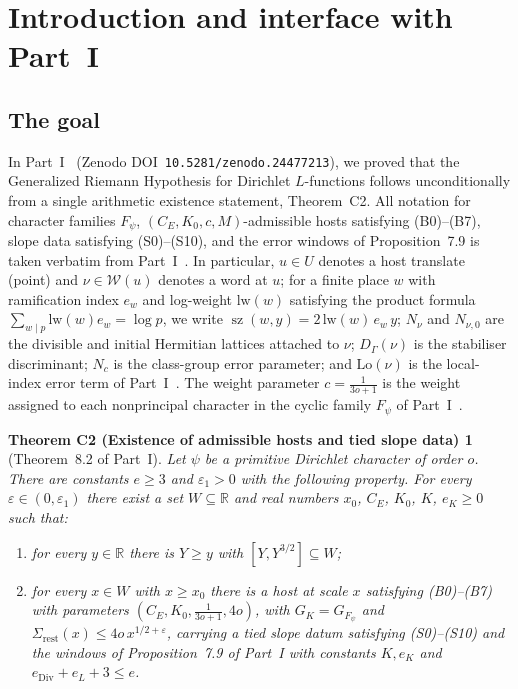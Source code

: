 \documentclass[11pt]{amsart}
\newcommand{\R}{\mathbb{R}}
\newcommand{\eps}{\varepsilon}
\DeclareMathOperator{\sz}{sz}
\theoremstyle{plain}
\newtheorem*{theoremC2}{Theorem C2 (Existence of admissible hosts and tied slope data)}
\theoremstyle{definition}
\numberwithin{equation}{section}
\begin{document}
\section{Introduction and interface with Part~I}\label{sec:intro}

\subsection{The goal}

In Part~I~\cite{dixit-part1} (Zenodo DOI~\texttt{10.5281/zenodo.24477213}), we proved that the
Generalized Riemann Hypothesis for Dirichlet $L$-functions follows unconditionally from a single
arithmetic existence statement, Theorem~C2. All notation for character families $F_\psi$,
$(C_E,K_0,c,M)$-admissible hosts satisfying (B0)--(B7), slope data satisfying (S0)--(S10), and the
error windows of Proposition~7.9 is taken verbatim from Part~I~\cite[\S\S5--8]{dixit-part1}.
In particular, $u\in U$ denotes a host translate (point) and $\nu\in\mathcal W(u)$ denotes a word
at $u$; for a finite place $w$ with ramification index $e_w$ and log-weight $\mathrm{lw}(w)$
satisfying the product formula $\sum_{w\mid p}\mathrm{lw}(w)e_w=\log p$, we write
$\sz(w,y)=2\,\mathrm{lw}(w)\,e_w\,y$; $N_\nu$ and $N_{\nu,0}$ are the divisible and initial
Hermitian lattices attached to $\nu$; $D_\Gamma(\nu)$ is the stabiliser discriminant; $N_c$ is the
class-group error parameter; and $\mathrm{Lo}(\nu)$ is the local-index error term of
Part~I~\cite[\S7.1]{dixit-part1}. The weight parameter $c=\frac{1}{3o+1}$ is the weight assigned to
each nonprincipal character in the cyclic family $F_\psi$ of Part~I~\cite[\S8.1]{dixit-part1}.

\begin{theoremC2}[Theorem~8.2 of Part~I]\label{thm:C2}
Let $\psi$ be a primitive Dirichlet character of order $o$. There are constants $e\ge3$ and
$\eps_1>0$ with the following property. For every $\eps\in(0,\eps_1)$ there exist a set
$W\subseteq\R$ and real numbers $x_0$, $C_E$, $K_0$, $K$, $e_K\ge0$ such that:
\begin{enumerate}[label=(\roman*)]
\item for every $y\in\R$ there is $Y\ge y$ with $[Y,Y^{3/2}]\subseteq W$;
\item for every $x\in W$ with $x\ge x_0$ there is a host at scale $x$ satisfying \textup{(B0)--(B7)}
  with parameters $(C_E,K_0,\frac1{3o+1},4o)$, with $G_K=G_{F_\psi}$ and
  $\Sigma_{\mathrm{rest}}(x)\le4o\,x^{1/2+\eps}$, carrying a tied slope datum satisfying
  \textup{(S0)--(S10)} and the windows of Proposition~7.9 of Part~I with constants $K,e_K$ and
  $e_{\mathrm{Div}}+e_L+3\le e$.
\end{enumerate}
\end{theoremC2}
\end{document}
